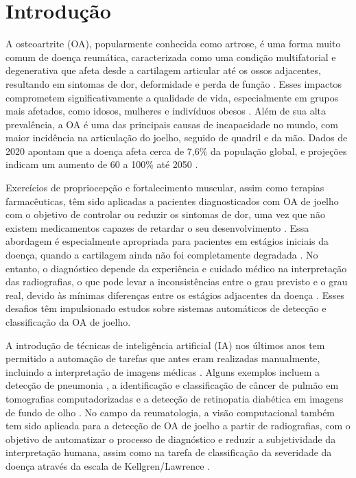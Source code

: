 
\chapter[Introdução]{Introdução}

A osteoartrite (OA), popularmente conhecida como artrose, é uma forma muito comum de doença reumática, caracterizada como uma condição multifatorial e degenerativa que afeta desde a cartilagem articular até os ossos adjacentes, resultando em sintomas de dor, deformidade e perda de função \citep{Kraus2015, PACCA2018}. Esses impactos comprometem significativamente a qualidade de vida, especialmente em grupos mais afetados, como idosos, mulheres e indivíduos obesos \citep{PACCA2018}. Além de sua alta prevalência, a OA é uma das principais causas de incapacidade no mundo, com maior incidência na articulação do joelho, seguido de quadril e da mão. Dados de 2020 apontam que a doença afeta cerca de 7,6\% da população global, e projeções indicam um aumento de 60 a 100\% até 2050 \citep{COURTIES20241397}.

Exercícios de propriocepção e fortalecimento muscular, assim como terapias farmacêuticas, têm sido aplicadas a pacientes diagnosticados com OA de joelho com o objetivo de controlar ou reduzir os sintomas de dor, uma vez que não existem medicamentos capazes de retardar o seu desenvolvimento \citep{Sardim2020, Lin2009}. Essa abordagem é especialmente apropriada para pacientes em estágios iniciais da doença, quando a cartilagem ainda não foi completamente degradada \citep{Kanamoto2020}. No entanto, o diagnóstico depende da experiência e cuidado médico na interpretação das radiografias, o que pode levar a inconsistências entre o grau previsto e o grau real, devido às mínimas diferenças entre os estágios adjacentes da doença \citep{KELLGREN1957, Mohammed2023}. Esses desafios têm impulsionado estudos sobre sistemas automáticos de detecção e classificação da OA de joelho.

A introdução de técnicas de inteligência artificial (IA) nos últimos anos tem permitido a automação de tarefas que antes eram realizadas manualmente, incluindo a interpretação de imagens médicas \citep{WANG2024103201}. Alguns exemplos incluem a detecção de pneumonia \cite{9077899}, a identificação e classificação de câncer de pulmão em tomografias computadorizadas e a detecção de retinopatia diabética em imagens de fundo de olho \citep{8697352, Dai2021}. No campo da reumatologia, a visão computacional também tem sido aplicada para a detecção de OA de joelho a partir de radiografias, com o objetivo de automatizar o processo de diagnóstico e reduzir a subjetividade da interpretação humana, assim como na tarefa de classificação da severidade da doença através da escala de Kellgren/Lawrence \citep{Mohammed2023}.

